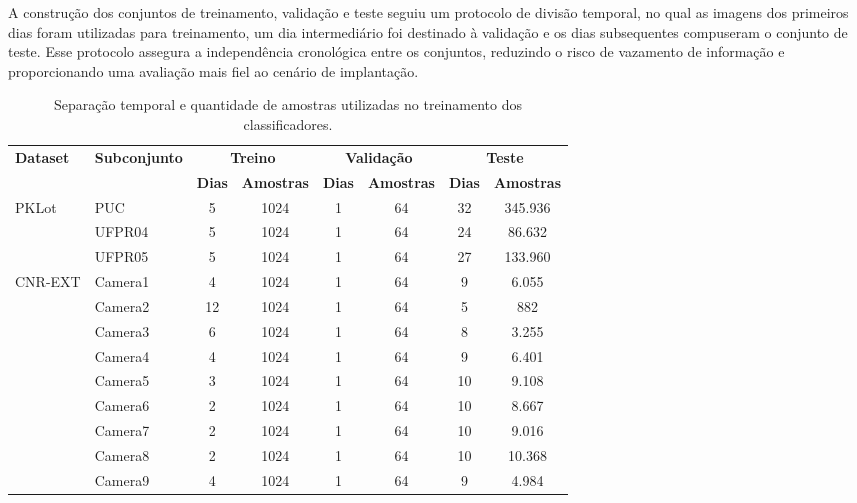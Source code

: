 \documentclass{article}
\begin{document}
A construção dos conjuntos de treinamento, validação e teste seguiu um protocolo de divisão temporal, no qual as imagens dos primeiros dias foram utilizadas para treinamento, um dia intermediário foi destinado à validação e os dias subsequentes compuseram o conjunto de teste. Esse protocolo assegura a independência cronológica entre os conjuntos, reduzindo o risco de vazamento de informação e proporcionando uma avaliação mais fiel ao cenário de implantação.

\begin{table}[!htbp]
\centering
\footnotesize
\caption{Separação temporal e quantidade de amostras utilizadas no treinamento dos classificadores.}
\label{tab:split_classificador}

\begin{tabular}{llcccccc}
\toprule
\multirow{2}{*}{\textbf{Dataset}} &
\multirow{2}{*}{\textbf{Subconjunto}} &
\multicolumn{2}{c}{\textbf{Treino}} &
\multicolumn{2}{c}{\textbf{Validação}} &
\multicolumn{2}{c}{\textbf{Teste}} \\
\cmidrule(lr){3-4}
\cmidrule(lr){5-6}
\cmidrule(lr){7-8}
&
& \textbf{Dias} & \textbf{Amostras}
& \textbf{Dias} & \textbf{Amostras}
& \textbf{Dias} & \textbf{Amostras} \\
\midrule

\multirow{3}{*}{PKLot}
& PUC      & 5 & 1024 & 1 & 64 & 32 & 345.936 \\
& UFPR04   & 5 & 1024 & 1 & 64 & 24 & 86.632 \\
& UFPR05   & 5 & 1024 & 1 & 64 & 27 & 133.960 \\

\midrule

\multirow{9}{*}{CNR-EXT}
& Camera1  & 4  & 1024 & 1 & 64 & 9  & 6.055 \\
& Camera2  & 12 & 1024 & 1 & 64 & 5  & 882 \\
& Camera3  & 6  & 1024 & 1 & 64 & 8  & 3.255 \\
& Camera4  & 4  & 1024 & 1 & 64 & 9  & 6.401 \\
& Camera5  & 3  & 1024 & 1 & 64 & 10 & 9.108 \\
& Camera6  & 2  & 1024 & 1 & 64 & 10 & 8.667 \\
& Camera7  & 2  & 1024 & 1 & 64 & 10 & 9.016 \\
& Camera8  & 2  & 1024 & 1 & 64 & 10 & 10.368 \\
& Camera9  & 4  & 1024 & 1 & 64 & 9  & 4.984 \\

\bottomrule
\end{tabular}
\end{table}
\end{document}
